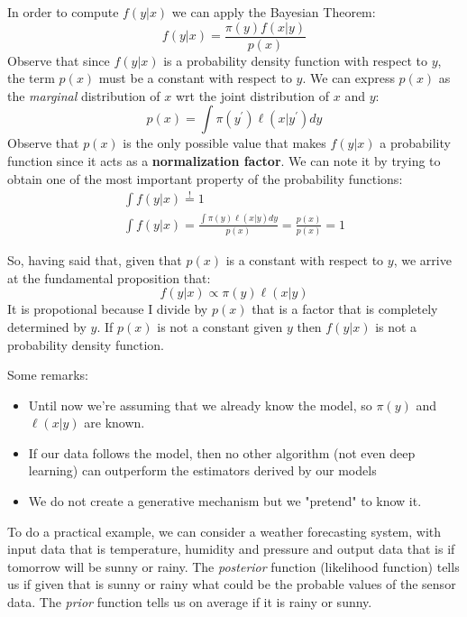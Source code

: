 In order to compute $f(y|x)$ we can apply the Bayesian Theorem:
\[
    f(y|x) = \frac{\pi(y) f(x|y)}{p(x)}
\]
Observe that since $f(y|x)$ is a probability density function with respect to $y$, the term $p(x)$ must be a constant with respect to $y$. We can express $p(x)$ as the \textit{marginal} distribution of $x$ wrt the joint distribution of $x$ and $y$:
\[
    p(x) = \int \pi(y^{\prime}) \ell(x|y^{\prime} ) dy
\]
Observe that $p(x)$ is the only possible value that makes $f(y|x)$ a probability function since it acts as a \textbf{normalization factor}.
We can note it by trying to obtain one of the most important property of the probability functions: %
\begin{gather*}
    \int f(y|x) \overset ! = 1 \\
    \int f(y|x) = \frac{\int \pi(y) \ell(x|y) dy}{p(x)} = \frac{p(x)}{p(x)} = 1
\end{gather*}

So, having said that, given that $p(x)$ is a constant with respect to $y$, we arrive at the fundamental proposition that:
\[
    f(y|x) \propto \pi(y) \ell(x|y)
\]
It is propotional because I divide by $p(x)$ that is a factor that is completely determined by $y$. If $p(x)$ is not a constant given $y$ then $f(y|x)$ is not a probability density function.

Some remarks:
\begin{itemize}
    \item Until now we're assuming that we already know the model, so $\pi(y)$ and $\ell(x|y)$ are known.
    \item If our data follows the model, then no other algorithm (not even deep learning) can outperform the estimators derived by our models
    \item We do not create a generative mechanism but we "pretend" to know it.
\end{itemize}

To do a practical example, we can consider a weather forecasting system, with input data that is temperature, humidity and pressure and output data that is if tomorrow will be sunny or rainy. The \textit{posterior} function (likelihood function) tells us if given that is sunny or rainy what could be the probable values of the sensor data. The \textit{prior} function tells us on average if it is rainy or sunny.

